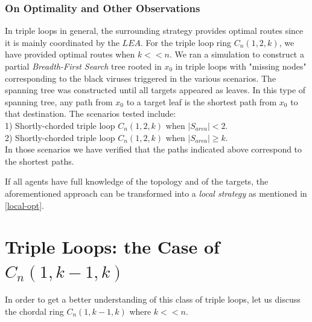 \subsubsection{On Optimality and Other Observations}
 

 In triple loops in general,  the surrounding strategy  provides optimal routes  since it is mainly coordinated by the $LEA$. For the triple loop ring $C_n(1,2,k)$, we have  provided optimal routes when $k<<n$. We ran a simulation to construct a partial  {\it Breadth-First Search} tree rooted in $x_0$ 
in triple loops  with "missing nodes" corresponding to the black viruses triggered in the various scenarios. The spanning tree was constructed until all targets appeared as leaves. In this type of spanning tree, any path from $x_0$ to a target leaf is the shortest path from $x_0$  to that destination. The scenarios tested include: \\
 1) Shortly-chorded triple loop $C_n(1,2,k)$ when $|S_{area}|<2$.\\
 2) Shortly-chorded triple loop $C_n(1,2,k)$ when $|S_{area}|\ge k$.\\
In those scenarios we have verified that the paths indicated above correspond to the shortest paths.

\medbreak

If all agents have full knowledge of the topology and of the targets, the aforementioned approach can be transformed into a {\em local strategy} as mentioned in \ref{local-opt}.



\section{ Triple Loops:  the Case of  $C_n(1,k-1,k)$}
In order to get a better understanding of this class of triple loops, let us discuss the chordal ring $C_n(1,k-1,k)$ where $k<<n$. 



